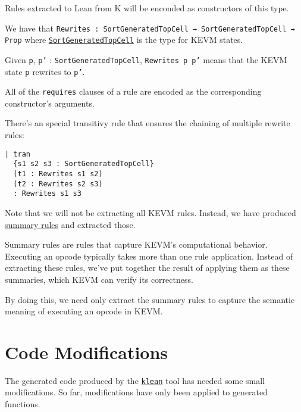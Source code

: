 \begin{definition}[Rewrites]\label{def:Rewrites}\leanok

Rules extracted to Lean from K will be enconded as constructors of this type.

We have that \texttt{Rewrites : SortGeneratedTopCell → SortGeneratedTopCell →
  Prop} where
\href{https://runtimeverification.github.io/evm-equivalence/docs/EvmEquivalence/KEVM2Lean/Sorts.html#SortGeneratedTopCell}{\texttt{SortGeneratedTopCell}}
is the type for KEVM states.

Given \texttt{p}, \texttt{p'} : \texttt{SortGeneratedTopCell}, \texttt{Rewrites
  p p'} means that the KEVM state \texttt{p} rewrites to \texttt{p'}.

All of the \texttt{requires} clauses of a rule are encoded as the corresponding constructor's arguments.

There's an special transitivy rule that ensures the chaining of multiple rewrite
rules:

\begin{verbatim}
| tran
  {s1 s2 s3 : SortGeneratedTopCell}
  (t1 : Rewrites s1 s2)
  (t2 : Rewrites s2 s3)
  : Rewrites s1 s3
\end{verbatim}

\end{definition}

Note that we will not be extracting all KEVM rules. Instead, we have produced
\href{https://github.com/runtimeverification/evm-semantics/tree/master/kevm-pyk/src/kevm_pyk/kproj/evm-semantics/summaries}{summary
  rules} and extracted those.

Summary rules are rules that capture KEVM's computational behavior. Executing an
opcode typically takes more than one rule application. Instead of extracting
these rules, we've put together the result of applying them as these summaries,
which KEVM can verify its correctness.

By doing this, we need only extract the summary rules to capture the semantic
meaning of executing an opcode in KEVM.

\section{Code Modifications}
The generated code produced by the \href{https://github.com/runtimeverification/k/tree/master/pyk/src/pyk/klean}{\texttt{klean}} tool has needed some small modifications.
So far, modifications have only been applied to generated functions.

